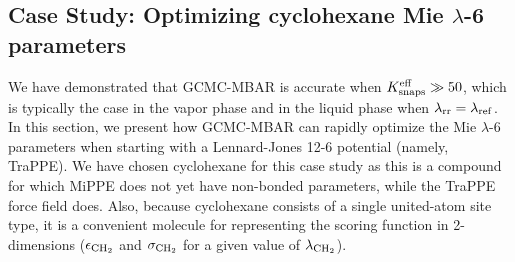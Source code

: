 \documentclass[journal=jced,manuscript=article]{achemso}
\begin{document}
%


\subsection{Case Study: Optimizing cyclohexane Mie $\lambda$-6 parameters} \label{sec: Case study}

We have demonstrated that GCMC-MBAR is accurate when $K_{\rm snaps}^{\rm eff} \gg 50$, which is typically the case in the vapor phase and in the liquid phase when $\lambda_{\rm rr} = \lambda_{\rm ref}$. In this section, we present how GCMC-MBAR can rapidly optimize the Mie $\lambda$-6 parameters when starting with a Lennard-Jones 12-6 potential (namely, TraPPE). We have chosen cyclohexane for this case study as this is a compound for which MiPPE does not yet have non-bonded parameters, while the TraPPE force field does. Also, because cyclohexane consists of a single united-atom site type, it is a convenient molecule for representing the scoring function in 2-dimensions ($\epsilon_{\rm CH_2}$ and $\sigma_{\rm CH_2}$ for a given value of $\lambda_{\rm CH_2}$).
\end{document}
